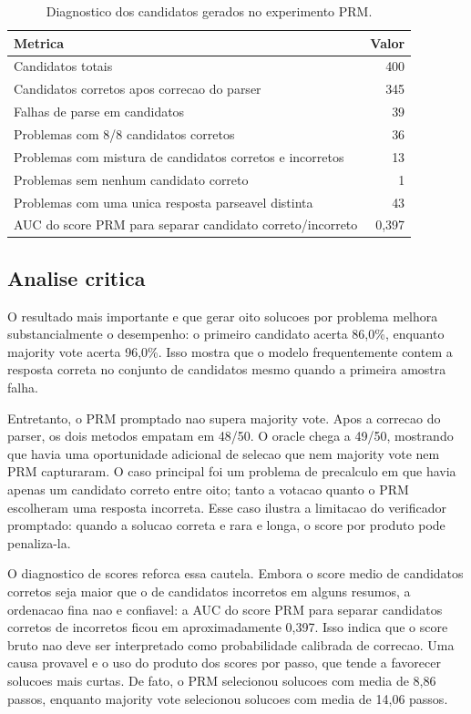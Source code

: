 \documentclass[a4paper,12pt]{article}
\begin{document}
\begin{table}[h]
\centering
\caption{Diagnostico dos candidatos gerados no experimento PRM.}
\label{tab:prm_diagnostic}
\begin{tabular}{lr}
\toprule
Metrica & Valor \\
\midrule
Candidatos totais & 400 \\
Candidatos corretos apos correcao do parser & 345 \\
Falhas de parse em candidatos & 39 \\
Problemas com 8/8 candidatos corretos & 36 \\
Problemas com mistura de candidatos corretos e incorretos & 13 \\
Problemas sem nenhum candidato correto & 1 \\
Problemas com uma unica resposta parseavel distinta & 43 \\
AUC do score PRM para separar candidato correto/incorreto & 0,397 \\
\bottomrule
\end{tabular}
\end{table}

\subsection{Analise critica}

O resultado mais importante e que gerar oito solucoes por problema melhora
substancialmente o desempenho: o primeiro candidato acerta 86,0\%, enquanto
majority vote acerta 96,0\%. Isso mostra que o modelo frequentemente contem a
resposta correta no conjunto de candidatos mesmo quando a primeira amostra falha.

Entretanto, o PRM promptado nao supera majority vote. Apos a correcao do
parser, os dois metodos empatam em 48/50. O oracle chega a 49/50, mostrando que
havia uma oportunidade adicional de selecao que nem majority vote nem PRM
capturaram. O caso principal foi um problema de precalculo em que havia apenas
um candidato correto entre oito; tanto a votacao quanto o PRM escolheram uma
resposta incorreta. Esse caso ilustra a limitacao do verificador promptado:
quando a solucao correta e rara e longa, o score por produto pode penaliza-la.

O diagnostico de scores reforca essa cautela. Embora o score medio de
candidatos corretos seja maior que o de candidatos incorretos em alguns
resumos, a ordenacao fina nao e confiavel: a AUC do score PRM para separar
candidatos corretos de incorretos ficou em aproximadamente 0,397. Isso indica
que o score bruto nao deve ser interpretado como probabilidade calibrada de
correcao. Uma causa provavel e o uso do produto dos scores por passo, que tende
a favorecer solucoes mais curtas. De fato, o PRM selecionou solucoes com media
de 8,86 passos, enquanto majority vote selecionou solucoes com media de 14,06
passos.
\end{document}
